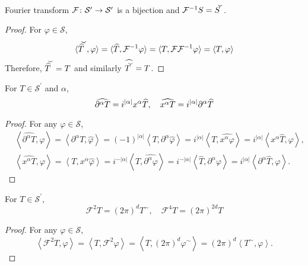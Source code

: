 \begin{enumerate}
	\begin{prop}
		Fourier transform $\mathcal{F} \colon \mathcal{S}^\prime \rightarrow \mathcal{S}^\prime$ is a bijection and $\mathcal{F}^{-1}S = \widecheck{S}$.
	\end{prop}
	\begin{proof}
		For $\varphi \in \mathcal{S}$,
		\begin{equation*}
			\inn{\widecheck{\widehat{T}}, \varphi} = \inn{\widehat{T}, \mathcal{F}^{-1}\varphi} = \inn{T,\mathcal{F}\mathcal{F}^{-1}\varphi} = \inn{T,\varphi}
		\end{equation*}
		Therefore, $\widecheck{\widehat{T}} = T$ and similarly $\widehat{\widecheck{T}} = T$.
	\end{proof}

	\begin{prop}
		For $T \in \mathcal{S}^\prime$ and $\alpha$,
		\begin{equation*}
			\widehat{\partial^\alpha T} = i^{\left\lvert\alpha\right\lvert}x^\alpha \widehat{T},\quad \widehat{x^\alpha T} = i^{\left\lvert\alpha\right\lvert}\partial^\alpha \widehat{T}
		\end{equation*}
	\end{prop}
	\begin{proof}
		For any $\varphi \in \mathcal{S}$,
		\begin{equation*}
			\begin{aligned}
				& \left\langle\widehat{\partial^\alpha T}, \varphi\right\rangle=\left\langle\partial^\alpha T, \widehat{\varphi}\right\rangle=(-1)^{|\alpha|}\left\langle T, \partial^\alpha \widehat{\varphi}\right\rangle=i^{|\alpha|}\left\langle T,\widehat{x^\alpha \varphi}\right\rangle=i^{|\alpha|}\left\langle x^\alpha \widehat{T}, \varphi\right\rangle, \\
				& \left\langle \widehat{x^\alpha T}, \varphi\right\rangle=\left\langle T, x^\alpha \widehat{\varphi}\right\rangle=i^{-|\alpha|}\left\langle T,\widehat{\partial^\alpha \varphi}\right\rangle=i^{-|\alpha|}\left\langle\widehat{T}, \partial^\alpha \varphi\right\rangle=i^{|\alpha|}\left\langle\partial^\alpha \widehat{T}, \varphi\right\rangle .
			\end{aligned}
		\end{equation*}
	\end{proof}

	\begin{prop}
		For $T \in \mathcal{S}^\prime$,
		\begin{equation*}
			\mathcal{F}^2 T=(2 \pi)^d T^{\sim},\quad \mathcal{F}^4 T=(2 \pi)^{2 d} T
		\end{equation*}
	\end{prop}
	\begin{proof}
		For any $\varphi \in \mathcal{S}$,
		\begin{equation*}
			\left\langle\mathcal{F}^2 T, \varphi\right\rangle=\left\langle T, \mathcal{F}^2 \varphi\right\rangle=\left\langle T,(2 \pi)^d \varphi^{\sim}\right\rangle=(2 \pi)^d\left\langle T^{\sim}, \varphi\right\rangle .
		\end{equation*}
	\end{proof}


\end{enumerate}

